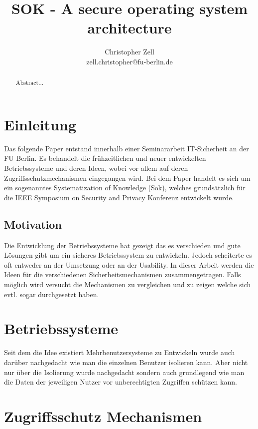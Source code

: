 \documentclass[9pt,technote]{IEEEtran}
\title{SOK - A secure operating system architecture}
\author{Christopher Zell\\
        zell.christopher@fu-berlin.de}
\begin{document}
\maketitle

  \begin{abstract}
    Abstract...
  \end{abstract}
  
  \section{Einleitung} \label{sec:intro}
    Das folgende Paper entstand innerhalb einer Seminararbeit IT-Sicherheit an der FU Berlin.
    Es behandelt die fr\"uhzeitlichen und neuer entwickelten Betriebssysteme und deren Ideen,
    wobei vor allem auf deren Zugriffsschutzmechanismen eingegangen wird.
    Bei dem Paper handelt es sich um ein sogenanntes Systematization of Knowledge (Sok),
    welches grunds\"atzlich f\"ur die IEEE Symposium on Security and Privacy Konferenz entwickelt wurde.
    
    \subsection{Motivation}
      Die Entwicklung der Betriebssysteme hat gezeigt das es verschieden und gute L\"osungen gibt um ein sicheres Betriebssystem zu entwickeln.
      Jedoch scheiterte es oft entweder an der Umsetzung oder an der Usability. In dieser Arbeit werden die Ideen f\"ur die verschiedenen Sicherheitsmechanismen  zusammengetragen.
      Falls m\"oglich wird versucht die Mechanismen zu vergleichen und zu zeigen welche sich evtl. sogar durchgesetzt haben.
   \section{Betriebssysteme}
     Seit dem die Idee existiert Mehrbenutzersysteme zu Entwickeln wurde auch dar\"uber nachgedacht wie man die einzelnen Benutzer isolieren kann.
     Aber nicht nur \"uber die Isolierung wurde nachgedacht sondern auch grundlegend wie man die Daten der jeweiligen Nutzer vor unberechtigten Zugriffen sch\"utzen kann.
     
  \section{Zugriffsschutz Mechanismen} \label{sec:protection}
  
\end{document}

